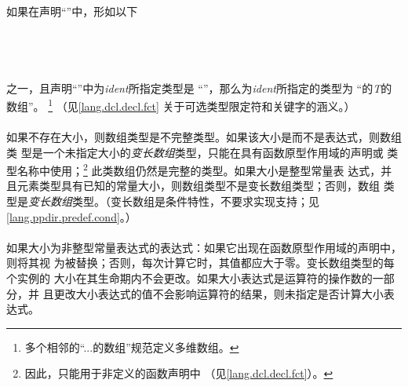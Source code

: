 {\paragraph{}
如果在声明``''中，形如以下                                    \\
\mbox{\hspace{4em}\tm{D[}  \tm{]}}                                    \\
\mbox{\hspace{4em}\tm{D[static}  \tm{]}}                                              \\
\mbox{\hspace{4em}\tm{D[}  
   \tm{]}}                                          \\
\mbox{\hspace{4em}\tm{D[}  \tm{*]}}         \\
之一，且声明``''中为\textit{ident}所指定类型是
``''，那么为\textit{ident}所指定的类型为
``的\textit{T}的数组''。
\footnote{多个相邻的``...的数组''规范定义多维数组。} （见\ref{lang.dcl.decl.fct}
关于可选类型限定符和关键字的涵义。）

\paragraph{}
如果不存在大小，则数组类型是不完整类型。如果该大小是\tm{*}而不是表达式，则数组类
型是一个未指定大小的\textit{变长数组}类型，只能在具有函数原型作用域的声明或
类型名称中使用；\footnote{因此，\tm{*}只能用于非定义的函数声明中
（见\ref{lang.dcl.decl.fct}）。} 此类数组仍然是完整的类型。如果大小是整型常量表
达式，并且元素类型具有已知的常量大小，则数组类型不是变长数组类型；否则，数组
类型是\textit{变长数组}类型。（变长数组是条件特性，不要求实现支持；见
\ref{lang.ppdir.predef.cond}。）

\paragraph{}
如果大小为非整型常量表达式的表达式：如果它出现在函数原型作用域的声明中，则将其视
为被\tm{*}替换；否则，每次计算它时，其值都应大于零。变长数组类型的每个实例的
大小在其生命期内不会更改。如果大小表达式是运算符的操作数的一部分，并
且更改大小表达式的值不会影响运算符的结果，则未指定是否计算大小表达式。

}
